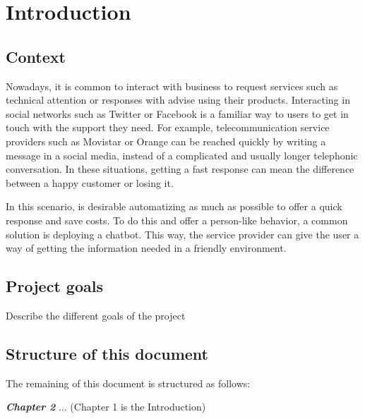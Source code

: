 \chapter{Introduction}

\section{Context}

Nowadays, it is common to interact with business to request services such as technical attention or responses with advise using their products. Interacting in social networks such as Twitter or Facebook is a familiar way to users to get in touch with the support they need. For example, telecommunication service providers such as Movistar or Orange can be reached quickly by writing a message in a social media, instead of a complicated and usually longer telephonic conversation. In these situations, getting a fast response can mean the difference between a happy customer or losing it.

In this scenario, is desirable automatizing as much as possible to offer a quick response and save costs. To do this and offer a person-like behavior, a common solution is deploying a chatbot. This way, the service provider can give the user a way of getting the information needed in a friendly environment.


\clearpage

\section{Project goals}

Describe the different goals of the project


\clearpage

\section{Structure of this document}

The remaining of this document is structured as follows:

\textbf{\textit{Chapter 2}} ... (Chapter 1 is the Introduction)